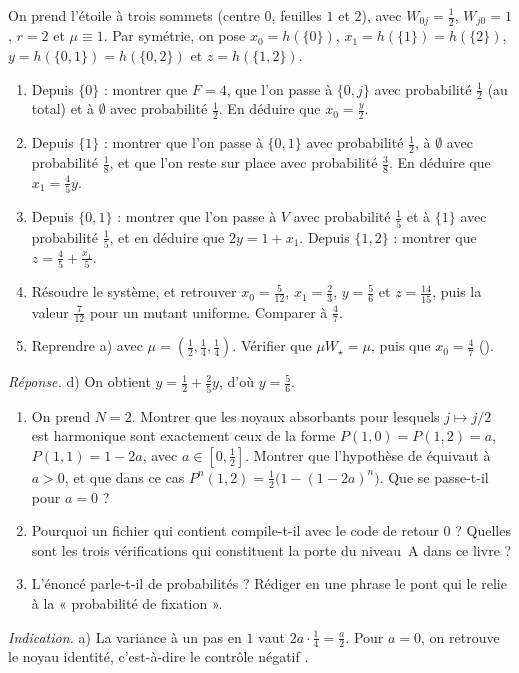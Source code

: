 \begin{exercise}\label{ch4:ex:star}
On prend l'étoile à trois sommets (centre $0$, feuilles $1$ et $2$), avec $W_{0j}=\frac12$, $W_{j0}=1$, $r=2$ et
$\mu\equiv1$. Par symétrie, on pose $x_0=h(\{0\})$, $x_1=h(\{1\})=h(\{2\})$, $y=h(\{0,1\})=h(\{0,2\})$ et
$z=h(\{1,2\})$.
\begin{enumerate}[label=\alph*),itemsep=0pt]
\item Depuis $\{0\}$ : montrer que $F=4$, que l'on passe à $\{0,j\}$ avec probabilité $\frac12$ (au total) et à
$\emptyset$ avec probabilité $\frac12$. En déduire que $x_0=\frac y2$.
\item Depuis $\{1\}$ : montrer que l'on passe à $\{0,1\}$ avec probabilité $\frac12$, à $\emptyset$ avec
probabilité $\frac18$, et que l'on reste sur place avec probabilité $\frac38$. En déduire que $x_1=\frac45y$.
\item Depuis $\{0,1\}$ : montrer que l'on passe à $V$ avec probabilité $\frac15$ et à $\{1\}$ avec probabilité
$\frac15$, et en déduire que $2y=1+x_1$. Depuis $\{1,2\}$ : montrer que $z=\frac45+\frac{x_1}5$.
\item Résoudre le système, et retrouver $x_0=\frac5{12}$, $x_1=\frac23$, $y=\frac56$ et $z=\frac{14}{15}$, puis la
valeur $\frac7{12}$ pour un mutant uniforme. Comparer à $\frac47$.
\item Reprendre a) avec $\mu=(\frac12,\frac14,\frac14)$. Vérifier que $\mu W_\star=\mu$, puis que $x_0=\frac47$
().
\end{enumerate}
\emph{Réponse.} d) On obtient $y=\frac12+\frac25y$, d'où $y=\frac56$.
\end{exercise}

\begin{exercise}
\begin{enumerate}[label=\alph*),itemsep=0pt]
\item On prend $N=2$. Montrer que les noyaux absorbants pour lesquels $j\mapsto j/2$ est harmonique sont
exactement ceux de la forme $P(1,0)=P(1,2)=a$, $P(1,1)=1-2a$, avec $a\in[0,\frac12]$. Montrer que l'hypothèse
 de  équivaut à $a>0$, et que dans ce cas $P^n(1,2)=\frac12\bigl(1-(1-2a)^n\bigr)$.
Que se passe-t-il pour $a=0$ ?
\item Pourquoi un fichier qui contient  compile-t-il avec le code de retour $0$ ? Quelles sont les trois
vérifications qui constituent la porte du niveau~A dans ce livre ?
\item L'énoncé  parle-t-il de probabilités ? Rédiger en une phrase le pont \tierC{} qui
le relie à la « probabilité de fixation ».
\end{enumerate}
\emph{Indication.} a) La variance à un pas en $1$ vaut $2a\cdot\frac14=\frac a2$. Pour $a=0$, on retrouve le
noyau identité, c'est-à-dire le contrôle négatif .
\end{exercise}

\label{ch4:fin}
\fussy
